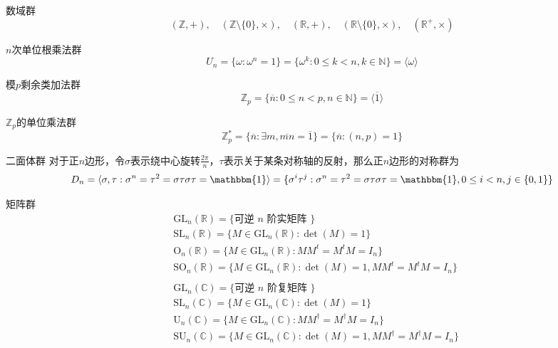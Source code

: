 \documentclass[lang = cn, scheme = chinese, thmcnt = section]{elegantbook}
\newcommand{\rang}{\rangle}            %
\begin{document}
\begin{definition}{数域群}
	$$
	(\mathbb{Z},+),\quad
	(\mathbb{Z}\setminus\{0\},\times),\quad
	(\mathbb{R},+),\quad
	(\mathbb{R}\setminus\{0\},\times),\quad
	(\mathbb{R}^+,\times)
	$$
\end{definition}

\begin{definition}{$n$次单位根乘法群}
	$$
	U_n=\{ \omega:\omega^n=1 \}=\{ \omega^k:0\le k <n,k\in\mathbb{N} \}=\langle \omega \rang
	$$
\end{definition}

\begin{definition}{模$p$剩余类加法群}
	$$
	\mathbb{Z}_p=\{ \overline{n}:0\le n<p,n\in\mathbb{N} \}=\langle\overline{1}\rang
	$$
\end{definition}

\begin{definition}{$\mathbb{Z}_p$的单位乘法群}
	$$
	\mathbb{Z}^*_p=\{ \overline{n}:\exists m,\overline{mn}=\overline{1} \}=\{ \overline{n}:(n,p)=1\}
	$$
\end{definition}

\begin{definition}{二面体群}
	对于正$n$边形，令$\sigma$表示绕中心旋转$\frac{2\pi}{n}$，$\tau$表示关于某条对称轴的反射，那么正$n$边形的对称群为
	$$
	D_n=\langle \sigma,\tau:\sigma^n=\tau^2=\sigma\tau\sigma\tau=\mathbbm{1} \rang=\{ \sigma^i \tau^j:\sigma^n=\tau^2=\sigma\tau\sigma\tau=\mathbbm{1},0\le i <n,j\in\{0,1\} \}
	$$
\end{definition}

\begin{definition}{矩阵群}
	\begin{align*}
		&\mathrm{GL}_n(\mathbb{R})=\{ \text{可逆 } n \text{ 阶实矩阵 } \}\\
		&\mathrm{SL}_n(\mathbb{R})=\{ M\in \mathrm{GL}_n(\mathbb{R}):\det(M)=1\}\\
		&\mathrm{O}_n(\mathbb{R})=\{ M\in \mathrm{GL}_n(\mathbb{R}):MM^t=M^tM=I_n\}\\
		&\mathrm{SO}_n(\mathbb{R})=\{ M\in \mathrm{GL}_n(\mathbb{R}):\det(M)=1,MM^t =M^t M=I_n\}\\
		\\
		&\mathrm{GL}_n(\mathbb{C})=\{ \text{可逆 } n \text{ 阶复矩阵 } \}\\
		&\mathrm{SL}_n(\mathbb{C})=\{ M\in \mathrm{GL}_n(\mathbb{C}):\det(M)=1\}\\
		&\mathrm{U}_n(\mathbb{C})=\{ M\in \mathrm{GL}_n(\mathbb{C}):MM^\dagger=M^\dagger M=I_n\}\\
		&\mathrm{SU}_n(\mathbb{C})=\{ M\in \mathrm{GL}_n(\mathbb{C}):\det(M)=1,MM^\dagger =M^\dagger M=I_n\}
	\end{align*}
\end{definition}
\end{document}
